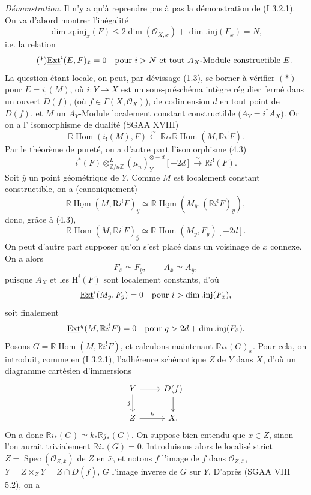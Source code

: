 \documentclass[11pt]{article}
\providecommand{\uH}{\underline{\mathrm H}}
\DeclareMathOperator{\Hom}{Hom}
\DeclareMathOperator{\Ext}{Ext}
\DeclareMathOperator{\Spec}{Spec}
\newcommand{\R}{\mathbb{R}}\newcommand{\RHomCore}{\mathbb{R}\mathrm{Hom}}
\newcommand{\Z}{\mathbb{Z}}
\providecommand{\Hom}{\operatorname{Hom}}
\providecommand{\R}{\mathrm R}
\providecommand{\Z}{\mathbb Z}
\providecommand{\Spec}{\operatorname{Spec}}
\providecommand{\Spec}{\operatorname{Spec}}
\providecommand{\Hom}{\operatorname{Hom}}
\providecommand{\Spec}{\operatorname{Spec}}
\providecommand{\Spec}{\operatorname{Spec}}
\begin{document}
\emph{Démonstration}. Il n'y a qu'à reprendre pas à pas la démonstration de (I 3.2.1). On va d'abord montrer l'inégalité
\[
        \dim.\mathrm{q.inj}_{\bar{x}}(F)\leq 2\dim(\mathcal{O}_{X,x})+\dim.\mathrm{inj}(F_{\bar{x}})=N,
\]
i.e. la relation
\begin{equation}\tag{*}
        \underline{\Ext}^{i}(E,F)_{\bar{x}}=0\quad\hbox{pour } i>N\hbox{ et tout }A_X\hbox{-Module constructible }E.
\end{equation}
La question étant locale, on peut, par dévissage (1.3), se borner à vérifier $(*)$ pour $E=i_!(M)$, où $i:Y\to X$ est un sous-préschéma intègre régulier fermé dans un ouvert $D(f)$, (où $f\in\Gamma(X,\mathcal{O}_X)$), de codimension $d$ en tout point de $D(f)$, et $M$ un $A_Y$-Module localement constant constructible ($A_Y=i^*A_X$).
Or on a l'%
isomorphisme de dualité (SGAA XVIII)
\[
        \R\underline{\Hom}(i_!(M),F)\xleftarrow{\sim} \R i_*\R\underline{\Hom}(M,\R i^!F).
\]
Par le théorème de pureté, on a d'autre part l'isomorphisme (4.3)
\[
        i^*(F)\otimes^L_{\Z/n\Z}(\mu_n)_Y^{\otimes -d}[-2d]\xrightarrow{\sim}\R i^!(F).
\]
Soit $\bar{y}$ un point géométrique de $Y$. Comme $M$ est localement constant constructible, on a (canoniquement)
\[
        \R\underline{\Hom}(M,\mathrm{R} i^!F)_{\bar{y}}\simeq \R\underline{\Hom}(M_{\bar{y}},(\R i^!F)_{\bar{y}}),
\]
donc, grâce à (4.3),
\[
        \R\underline{\Hom}(M,\R i^!F)_{\bar{y}}\simeq \R\underline{\Hom}(M_{\bar{y}},F_{\bar{y}})[-2d].
\]
On peut d'autre part supposer qu'on s'est placé dans un voisinage de $x$ connexe. On a alors
\[
        F_{\bar{x}}\simeq F_{\bar{y}},\qquad A_{\bar{x}}\simeq A_{\bar{y}},
\]
puisque $A_X$ et les $\uH^i(F)$ sont localement constants, d'où
\[
        \underline{\Ext}^i(M_{\bar{y}},F_{\bar{y}})=0\quad\hbox{pour }i>\dim.\mathrm{inj}(F_{\bar{x}}),
\]
soit finalement
\[
        \underline{\Ext}^{q}(M,\R i^!F)=0\quad\hbox{pour }q>2d+\dim.\mathrm{inj}(F_{\bar{x}}).
\]
Posons $G=\R\underline{\Hom}(M,\R i^!F)$, et calculons maintenant $\R i_*(G)_{\bar{x}}$. Pour cela, on introduit, comme en (I 3.2.1), l'adhérence schématique $Z$ de $Y$ dans $X$, d'où un diagramme cartésien d'immersions
\[
\begin{tikzcd}
Y \arrow[r] \arrow[d,"j"'] & D(f) \arrow[d]\\
Z \arrow[r,"k"] & X.
\end{tikzcd}
\]
On a
donc $\R i_*(G)\simeq k_*\R j_*(G)$. On suppose bien entendu que $x\in Z$, sinon l'on aurait trivialement $\R i_*(G)=0$. Introduisons alors le localisé strict $\bar{Z}=\Spec(\mathcal{O}_{Z,\bar{x}})$ de $Z$ en $\bar{x}$, et notons $\bar{f}$ l'image de $f$ dans $\mathcal{O}_{Z,\bar{x}}$, $\bar{Y}=\bar{Z}\times_ZY=\bar{Z}\cap D(\bar{f})$, $\bar{G}$ l'image inverse de $G$ sur $\bar{Y}$. D'après (SGAA VIII 5.2), on a
\end{document}

